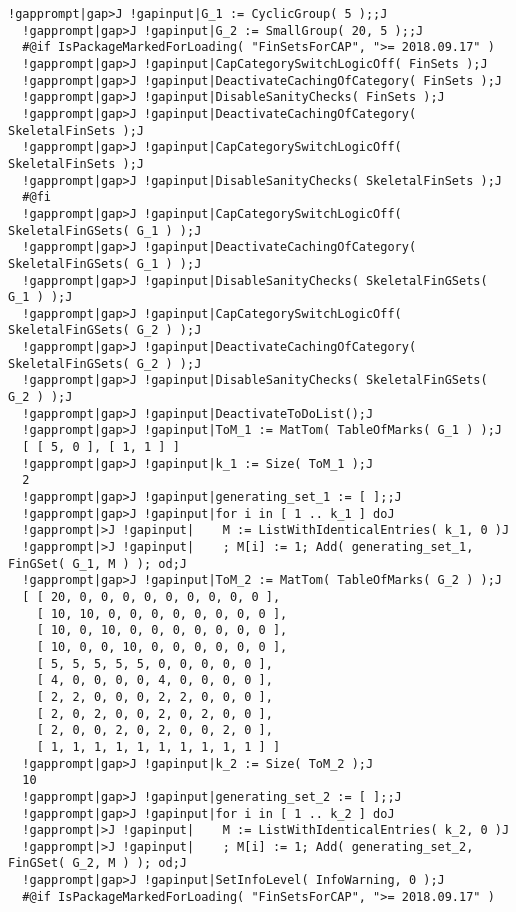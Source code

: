 \documentclass[a4paper,11pt]{report}
\begin{document}
{{{\begin{Verbatim}[commandchars=!|J,fontsize=\small,frame=single,label=Example]
  !gapprompt|gap>J !gapinput|G_1 := CyclicGroup( 5 );;J
  !gapprompt|gap>J !gapinput|G_2 := SmallGroup( 20, 5 );;J
  #@if IsPackageMarkedForLoading( "FinSetsForCAP", ">= 2018.09.17" )
  !gapprompt|gap>J !gapinput|CapCategorySwitchLogicOff( FinSets );J
  !gapprompt|gap>J !gapinput|DeactivateCachingOfCategory( FinSets );J
  !gapprompt|gap>J !gapinput|DisableSanityChecks( FinSets );J
  !gapprompt|gap>J !gapinput|DeactivateCachingOfCategory( SkeletalFinSets );J
  !gapprompt|gap>J !gapinput|CapCategorySwitchLogicOff( SkeletalFinSets );J
  !gapprompt|gap>J !gapinput|DisableSanityChecks( SkeletalFinSets );J
  #@fi
  !gapprompt|gap>J !gapinput|CapCategorySwitchLogicOff( SkeletalFinGSets( G_1 ) );J
  !gapprompt|gap>J !gapinput|DeactivateCachingOfCategory( SkeletalFinGSets( G_1 ) );J
  !gapprompt|gap>J !gapinput|DisableSanityChecks( SkeletalFinGSets( G_1 ) );J
  !gapprompt|gap>J !gapinput|CapCategorySwitchLogicOff( SkeletalFinGSets( G_2 ) );J
  !gapprompt|gap>J !gapinput|DeactivateCachingOfCategory( SkeletalFinGSets( G_2 ) );J
  !gapprompt|gap>J !gapinput|DisableSanityChecks( SkeletalFinGSets( G_2 ) );J
  !gapprompt|gap>J !gapinput|DeactivateToDoList();J
  !gapprompt|gap>J !gapinput|ToM_1 := MatTom( TableOfMarks( G_1 ) );J
  [ [ 5, 0 ], [ 1, 1 ] ]
  !gapprompt|gap>J !gapinput|k_1 := Size( ToM_1 );J
  2
  !gapprompt|gap>J !gapinput|generating_set_1 := [ ];;J
  !gapprompt|gap>J !gapinput|for i in [ 1 .. k_1 ] doJ
  !gapprompt|>J !gapinput|    M := ListWithIdenticalEntries( k_1, 0 )J
  !gapprompt|>J !gapinput|    ; M[i] := 1; Add( generating_set_1, FinGSet( G_1, M ) ); od;J
  !gapprompt|gap>J !gapinput|ToM_2 := MatTom( TableOfMarks( G_2 ) );J
  [ [ 20, 0, 0, 0, 0, 0, 0, 0, 0, 0 ], 
    [ 10, 10, 0, 0, 0, 0, 0, 0, 0, 0 ], 
    [ 10, 0, 10, 0, 0, 0, 0, 0, 0, 0 ], 
    [ 10, 0, 0, 10, 0, 0, 0, 0, 0, 0 ], 
    [ 5, 5, 5, 5, 5, 0, 0, 0, 0, 0 ], 
    [ 4, 0, 0, 0, 0, 4, 0, 0, 0, 0 ], 
    [ 2, 2, 0, 0, 0, 2, 2, 0, 0, 0 ], 
    [ 2, 0, 2, 0, 0, 2, 0, 2, 0, 0 ], 
    [ 2, 0, 0, 2, 0, 2, 0, 0, 2, 0 ], 
    [ 1, 1, 1, 1, 1, 1, 1, 1, 1, 1 ] ]
  !gapprompt|gap>J !gapinput|k_2 := Size( ToM_2 );J
  10
  !gapprompt|gap>J !gapinput|generating_set_2 := [ ];;J
  !gapprompt|gap>J !gapinput|for i in [ 1 .. k_2 ] doJ
  !gapprompt|>J !gapinput|    M := ListWithIdenticalEntries( k_2, 0 )J
  !gapprompt|>J !gapinput|    ; M[i] := 1; Add( generating_set_2, FinGSet( G_2, M ) ); od;J
  !gapprompt|gap>J !gapinput|SetInfoLevel( InfoWarning, 0 );J
  #@if IsPackageMarkedForLoading( "FinSetsForCAP", ">= 2018.09.17" )

\end{Verbatim}}}}
\end{document}
